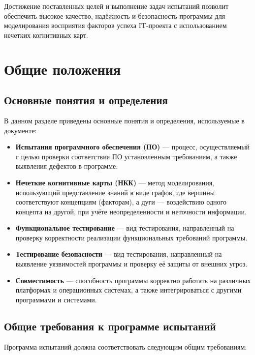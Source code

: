 \documentclass{article}
\begin{document}
    Достижение поставленных целей и выполнение задач испытаний позволит обеспечить высокое качество, надёжность и безопасность программы для моделирования восприятия факторов успеха IT-проекта с использованием нечетких когнитивных карт.
    \newpage
    \section{Общие положения}
    \subsection{Основные понятия и определения}

    В данном разделе приведены основные понятия и определения, используемые в документе:

    \begin{itemize}
        \item \textbf{Испытания программного обеспечения (ПО)} — процесс, осуществляемый с целью проверки соответствия ПО установленным требованиям, а также выявления дефектов в программе.
        \item \textbf{Нечеткие когнитивные карты (НКК)} — метод моделирования, использующий представление знаний в виде графов, где вершины соответствуют концепциям (факторам), а дуги — воздействию одного концепта на другой, при учёте неопределенности и неточности информации\cite{litlink4}.
        \item \textbf{Функциональное тестирование} — вид тестирования, направленный на проверку корректности реализации функциональных требований программы\cite{litlink5}.
        \item \textbf{Тестирование безопасности} — вид тестирования, направленный на выявление уязвимостей программы и проверку её защиты от внешних угроз\cite{litlink6}.
        \item \textbf{Совместимость} — способность программы корректно работать на различных платформах и операционных системах, а также интегрироваться с другими программами и системами.
    \end{itemize}

    \subsection{Общие требования к программе испытаний}

    Программа испытаний должна соответствовать следующим общим требованиям\cite{litlink7}:
\end{document}

